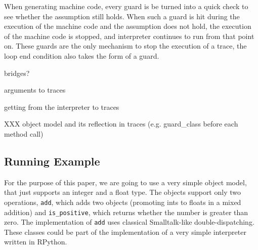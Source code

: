 \documentclass{sigplanconf}
\begin{document}
When generating machine code, every guard is be turned into a quick check to
see whether the assumption still holds. When such a guard is hit during the
execution of the machine code and the assumption does not hold, the execution of
the machine code is stopped, and interpreter continues to run from that point
on. These guards are the only mechanism to stop the execution of a trace, the
loop end condition also takes the form of a guard.

bridges?

arguments to traces

getting from the interpreter to traces

XXX object model and its reflection in traces (e.g. guard\_class before each method call)

\subsection{Running Example}

For the purpose of this paper, we are going to use a very simple object
model, that just supports an integer and a float type. The objects support only
two operations, \texttt{add}, which adds two objects (promoting ints to floats in a
mixed addition) and \texttt{is\_positive}, which returns whether the number is greater
than zero. The implementation of \texttt{add} uses classical Smalltalk-like
double-dispatching. These classes could be part of the implementation of a very
simple interpreter written in RPython.
\end{document}
